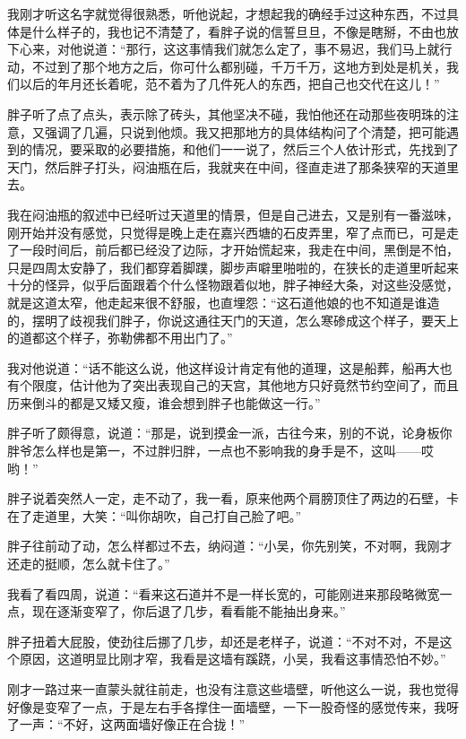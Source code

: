 我刚才听这名字就觉得很熟悉，听他说起，才想起我的确经手过这种东西，不过具体是什么样子的，我也记不清楚了，看胖子说的信誓旦旦，不像是瞎掰，不由也放下心来，对他说道：“那行，这这事情我们就怎么定了，事不易迟，我们马上就行动，不过到了那个地方之后，你可什么都别碰，千万千万，这地方到处是机关，我们以后的年月还长着呢，范不着为了几件死人的东西，把自己也交代在这儿！”

胖子听了点了点头，表示除了砖头，其他坚决不碰，我怕他还在动那些夜明珠的注意，又强调了几遍，只说到他烦。我又把那地方的具体结构问了个清楚，把可能遇到的情况，要采取的必要措施，和他们一一说了，然后三个人依计形式，先找到了天门，然后胖子打头，闷油瓶在后，我就夹在中间，径直走进了那条狭窄的天道里去。

我在闷油瓶的叙述中已经听过天道里的情景，但是自己进去，又是别有一番滋味，刚开始并没有感觉，只觉得是晚上走在嘉兴西塘的石皮弄里，窄了点而已，可是走了一段时间后，前后都已经没了边际，才开始慌起来，我走在中间，黑倒是不怕，只是四周太安静了，我们都穿着脚蹼，脚步声噼里啪啦的，在狭长的走道里听起来十分的怪异，似乎后面跟着个什么怪物跟着似地，胖子神经大条，对这些没感觉，就是这道太窄，他走起来很不舒服，也直埋怨：“这石道他娘的也不知道是谁造的，摆明了歧视我们胖子，你说这通往天门的天道，怎么寒碜成这个样子，要天上的道都这个样子，弥勒佛都不用出门了。”

我对他说道：“话不能这么说，他这样设计肯定有他的道理，这是船葬，船再大也有个限度，估计他为了突出表现自己的天宫，其他地方只好竟然节约空间了，而且历来倒斗的都是又矮又瘦，谁会想到胖子也能做这一行。”

胖子听了颇得意，说道：“那是，说到摸金一派，古往今来，别的不说，论身板你胖爷怎么样也是第一，不过胖归胖，一点也不影响我的身手是不，这叫——哎哟！”

胖子说着突然人一定，走不动了，我一看，原来他两个肩膀顶住了两边的石壁，卡在了走道里，大笑：“叫你胡吹，自己打自己脸了吧。”

胖子往前动了动，怎么样都过不去，纳闷道：“小吴，你先别笑，不对啊，我刚才还走的挺顺，怎么就卡住了。”

我看了看四周，说道：“看来这石道并不是一样长宽的，可能刚进来那段略微宽一点，现在逐渐变窄了，你后退了几步，看看能不能抽出身来。”

胖子扭着大屁股，使劲往后挪了几步，却还是老样子，说道：“不对不对，不是这个原因，这道明显比刚才窄，我看是这墙有蹊跷，小吴，我看这事情恐怕不妙。”

刚才一路过来一直蒙头就往前走，也没有注意这些墙壁，听他这么一说，我也觉得好像是变窄了一点，于是左右手各撑住一面墙壁，一下一股奇怪的感觉传来，我呀了一声：“不好，这两面墙好像正在合拢！”

